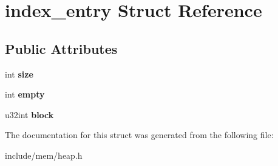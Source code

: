 \hypertarget{structindex__entry}{}\section{index\+\_\+entry Struct Reference}
\label{structindex__entry}
\subsection*{Public Attributes}
\begin{DoxyCompactItemize}
\item 
int {\bfseries size}\hypertarget{structindex__entry_a2b0247aae5c7f9884f8eef1ee121adb0}{}\label{structindex__entry_a2b0247aae5c7f9884f8eef1ee121adb0}

\item 
int {\bfseries empty}\hypertarget{structindex__entry_afdbdffb4bd17e4ab003b94be3d5bade7}{}\label{structindex__entry_afdbdffb4bd17e4ab003b94be3d5bade7}

\item 
u32int {\bfseries block}\hypertarget{structindex__entry_a0a8d4dc0595b5f2ef42e7080c5221c1f}{}\label{structindex__entry_a0a8d4dc0595b5f2ef42e7080c5221c1f}

\end{DoxyCompactItemize}


The documentation for this struct was generated from the following file\+:\begin{DoxyCompactItemize}
\item 
include/mem/heap.\+h\end{DoxyCompactItemize}

